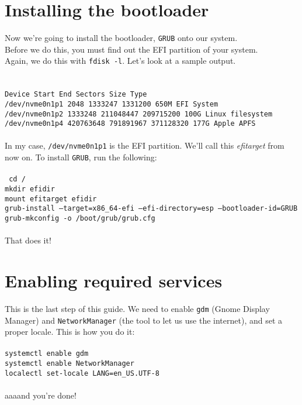 \documentclass{article}
\begin{document}
\section{Installing the bootloader}
Now we're going to install the bootloader, \texttt{GRUB} onto our system.
\\Before we do this, you must find out the EFI partition of your system.
\\Again, we do this with \texttt{fdisk -l}. Let's look at a sample output.
\\\\
\texttt{
  \\
Device             Start        End   Sectors  Size Type\\
/dev/nvme0n1p1      2048    1333247   1331200  650M EFI System\\
/dev/nvme0n1p2   1333248  211048447 209715200  100G Linux filesystem\\
/dev/nvme0n1p4 420763648  791891967 371128320  177G Apple APFS\\
}
\\
In my case, \texttt{/dev/nvme0n1p1} is the EFI partition. We'll call this \textit{efitarget} from now on. To install \texttt{GRUB}, run the following:
\\\\
\texttt{
  cd /\\
  mkdir efidir\\
  mount efitarget efidir\\
  grub-install --target=x86\_64-efi --efi-directory=esp --bootloader-id=GRUB
  grub-mkconfig -o /boot/grub/grub.cfg
}
\\\\
That does it!

\section{Enabling required services}
This is the last step of this guide. We need to enable \texttt{gdm} (Gnome Display Manager) and \texttt{NetworkManager} (the tool to let us use the internet), and set a proper locale. This is how you do it:
\\\\
\texttt{systemctl enable gdm}\\
\texttt{systemctl enable NetworkManager}\\
\texttt{localectl set-locale LANG=en\_US.UTF-8}
\\\\
aaaand you're done!
\end{document}
